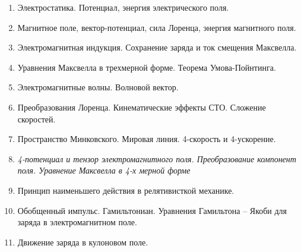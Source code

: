 \documentclass[unicode,10pt]{article}
\begin{document}
{\bfseries
{}

}

\begin{enumerate}
\item Электростатика. Потенциал, энергия электрического поля.
\item Магнитное поле, вектор-потенциал, сила Лоренца, энергия
  магнитного поля.
\item Электромагнитная индукция. Сохранение заряда и ток смещения Максвелла.
\item Уравнения Максвелла в трехмерной форме. Теорема Умова-Пойнтинга.
\item Электромагнитные волны. Волновой вектор.
\item Преобразования Лоренца. Кинематические эффекты СТО. Сложение скоростей.
\item Пространство Минковского. Мировая линия. 4-скорость и 4-ускорение.
\item \textit{4-потенциал и тензор электромагнитного
  поля. Преобразование компонент поля. Уравнение Максвелла в 4-х
  мерной форме}
\item Принцип наименьшего действия в релятивисткой механике.
\item Обобщенный импульс. Гамильтониан. Уравнения Гамильтона -- Якоби
  для заряда в электромагнитном поле.
\item Движение заряда в кулоновом поле.
\end{enumerate}
\end{document}
